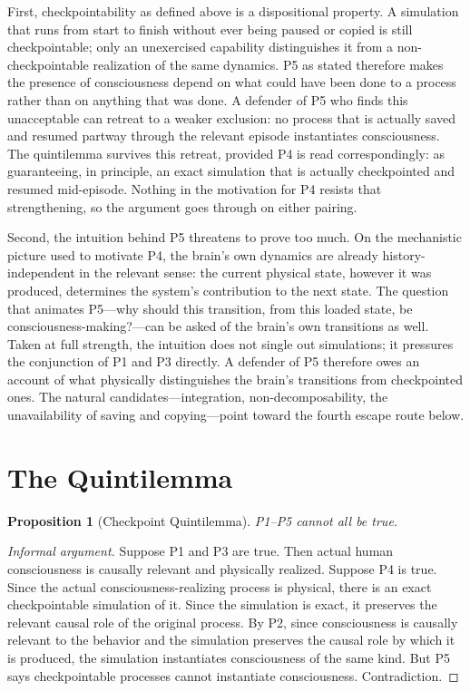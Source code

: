 \documentclass[11pt]{article}
\newtheorem{proposition}{Proposition}
\begin{document}
First, checkpointability as defined above is a dispositional property. A
simulation that runs from start to finish without ever being paused or copied
is still checkpointable; only an unexercised capability distinguishes it from
a non-checkpointable realization of the same dynamics. P5 as stated therefore
makes the presence of consciousness depend on what could have been done to a
process rather than on anything that was done. A defender of P5 who finds this
unacceptable can retreat to a weaker exclusion: no process that is actually
saved and resumed partway through the relevant episode instantiates
consciousness. The quintilemma survives this retreat, provided P4 is read
correspondingly: as guaranteeing, in principle, an exact simulation that is
actually checkpointed and resumed mid-episode. Nothing in the motivation for
P4 resists that strengthening, so the argument goes through on either pairing.

Second, the intuition behind P5 threatens to prove too much. On the
mechanistic picture used to motivate P4, the brain's own dynamics are already
history-independent in the relevant sense: the current physical state, however
it was produced, determines the system's contribution to the next state. The
question that animates P5---why should this transition, from this loaded
state, be consciousness-making?---can be asked of the brain's own transitions
as well. Taken at full strength, the intuition does not single out
simulations; it pressures the conjunction of P1 and P3 directly. A defender of
P5 therefore owes an account of what physically distinguishes the brain's
transitions from checkpointed ones. The natural candidates---integration,
non-decomposability, the unavailability of saving and copying---point toward
the fourth escape route below.

\section{The Quintilemma}

\begin{proposition}[Checkpoint Quintilemma]
  P1--P5 cannot all be true.
\end{proposition}

\begin{proof}[Informal argument]
  Suppose P1 and P3 are true. Then actual human consciousness is causally
  relevant and physically realized. Suppose P4 is true. Since the actual
  consciousness-realizing process is physical, there is an exact checkpointable
  simulation of it. Since the simulation is exact, it preserves the relevant
  causal role of the original process. By P2, since consciousness is causally
  relevant to the behavior and the simulation preserves the causal role by
  which it is produced, the simulation instantiates consciousness of the same
  kind. But P5 says checkpointable processes cannot instantiate consciousness.
  Contradiction.
\end{proof}
\end{document}

